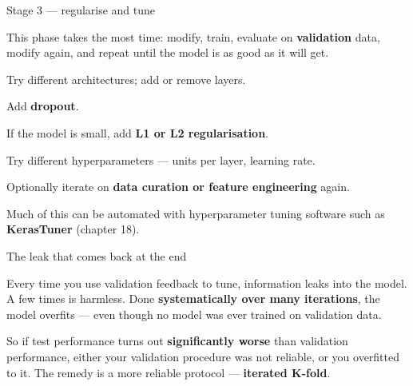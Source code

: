\documentclass[aspectratio=169,11pt,t]{beamer}
\begin{document}
\begin{frame}[shrink=25]{Stage 3 --- regularise and tune}
{\fontsize{9.4}{12.6}\selectfont\color{fg2}This phase takes the most time: modify, train, evaluate on \textbf{validation} data, modify again, and repeat until the model is as good as it will get.\par}\vskip 4pt
\begin{ibullets}
\item Try different architectures; add or remove layers.
\item Add \textbf{dropout}.
\item If the model is small, add \textbf{L1 or L2 regularisation}.
\item Try different hyperparameters --- units per layer, learning rate.
\item Optionally iterate on \textbf{data curation or feature engineering} again.
\end{ibullets}
{\fontsize{9.4}{12.6}\selectfont\color{fg2}Much of this can be automated with hyperparameter tuning software such as \textbf{KerasTuner} (chapter 18).\par}\vskip 4pt
\end{frame}

\begin{frame}[shrink=25]{The leak that comes back at the end}
\begin{iband}[rose]
Every time you use validation feedback to tune, information leaks into the model. A few times is harmless. Done \textbf{systematically over many iterations}, the model overfits  --- even though no model was ever trained on validation data.
\end{iband}
{\fontsize{9.4}{12.6}\selectfont\color{fg2}So if test performance turns out \textbf{significantly worse} than validation performance, either your validation procedure was not reliable, or you overfitted to it. The remedy is a more reliable protocol --- \textbf{iterated K-fold}.\par}\vskip 4pt
\end{frame}

\end{document}
